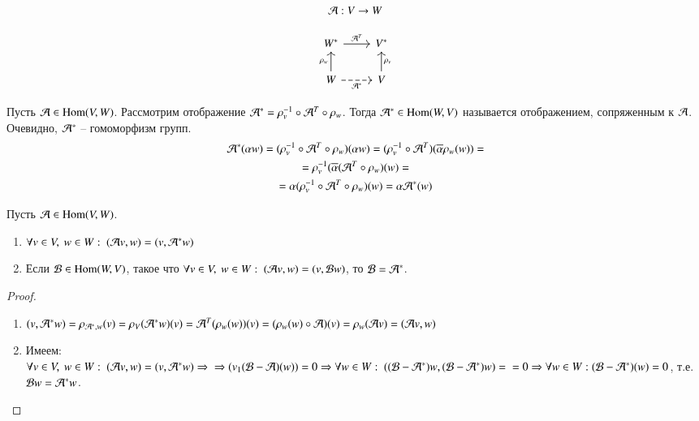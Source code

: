 \documentclass[main]{subfiles}
\begin{document}
\[ \mathcal{A}: V \rightarrow W\]

\[\begin{tikzcd}
        {W^*} & {V^*} \\
        W & V
        \arrow["{\mathcal{A}^T}", from=1-1, to=1-2]
        \arrow["{\rho_v}"', from=2-2, to=1-2]
        \arrow["{\rho_w}", from=2-1, to=1-1]
        \arrow["{\mathcal{A}^*}"', dashed, from=2-1, to=2-2]
    \end{tikzcd}\]

Пусть $\mathcal{A} \in \operatorname{Hom}(V, W)$. Рассмотрим отображение $\mathcal{A}^* = \rho_v^{-1} \circ \mathcal{A}^T \circ \rho_w$. Тогда $\mathcal{A}^* \in \operatorname{Hom}(W, V)$ называется отображением, сопряженным к $\mathcal{A}$.
Очевидно, $\mathcal{A}^*$ -- гомоморфизм групп.
\begin{gather*}
    \mathcal{A}^*(\alpha w) = (\rho_v^{-1} \circ \mathcal{A}^T \circ \rho_w)(\alpha w) = (\rho_v^{-1} \circ \mathcal{A}^T)(\overline{\alpha} \rho_w(w)) = \\
    = \rho_v^{-1} (\overline{\alpha} ( \mathcal{A}^T \circ \rho_w)(w) = \\
    = \alpha (\rho_v^{-1} \circ \mathcal{A}^T \circ \rho_w) (w) = \alpha \mathcal{A}^* (w)
\end{gather*}

\begin{proposition} 
    Пусть $\mathcal{A} \in \operatorname{Hom}(V, W)$.

    \begin{enumerate}
        \item $\forall v \in V, \ w \in W: \ (\mathcal{A} v, w) = (v, \mathcal{A}^* w)$
        \item Если $\mathcal{B} \in \operatorname{Hom} (W, V)$, такое что $\forall v \in V, \ w \in W: \ (\mathcal{A} v, w) = (v, \mathcal{B} w)$,  то $\mathcal{B} = \mathcal{A}^*$.
    \end{enumerate}
\end{proposition}

\begin{proof}
    \begin{enumerate}
        \item $(v, \mathcal{A}^* w) = \rho_{\mathcal{A}^*, w} (v) = \rho_V (\mathcal{A}^*w)(v) = \mathcal{A}^T(\rho_w(w))(v) = (\rho_w(w) \circ \mathcal{A})(v) = \rho_w (\mathcal{A} v) = (\mathcal{A} v, w)$
        \item Имеем: $\forall v \in V, \ w \in W: \ (\mca v, w) = (v, \mca^* w) \Rightarrow \\ \Rightarrow (v_1 (\mcb - \mca)(w)) = 0 \Rightarrow \forall w \in W: \ ((\mcb - \mca^*)w, (\mcb - \mca^*)w) = \\ = 0 \Rightarrow \forall w \in W: (\mcb - \mca^*)(w) = 0$, т.е. $\mathcal{B} w = \mathcal{A}^* w$.
    \end{enumerate}
\end{proof}
\end{document}
